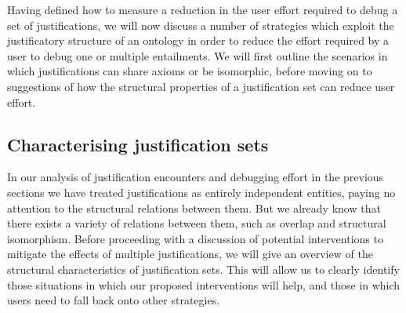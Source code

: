 Having defined how to measure a reduction in the user effort required to debug a set of justifications, we will now discuss a number of strategies which exploit the justificatory structure of an ontology in order to reduce the effort required by a user to debug one or multiple entailments. We will first outline the scenarios in which justifications can share axioms or be isomorphic, before moving on to suggestions of how the structural properties of a justification set can reduce user effort.

\subsection{Characterising justification sets}

In our analysis of justification encounters and debugging effort in the previous sections we have treated justifications as entirely independent entities, paying no attention to the structural relations between them. But we already know  that there exists a variety of relations between them, such as overlap and structural isomorphism. Before proceeding with a discussion of potential interventions to mitigate the effects of multiple justifications, we will give an overview of the structural characteristics of justification sets. This will allow us to clearly identify those situations in which our proposed interventions will help, and those in which users need to fall back onto other strategies.

